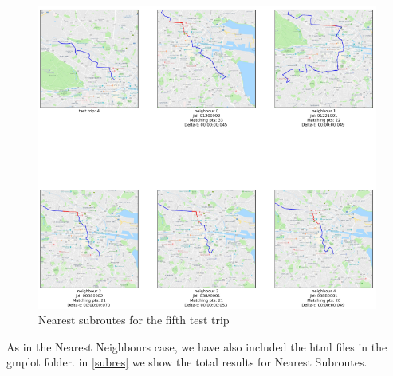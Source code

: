 \documentclass[12pt]{article}
\begin{document}
	\begin{figure} [H]
		\begin{center}
			\includegraphics [scale = 0.80] {subroutes5.png}
			\caption{Nearest subroutes for the fifth test trip}
		\end{center}
	\end{figure}

	As in the Nearest Neighbours case, we have also included the html files in the gmplot folder. in \ref{subres} we show the total results for Nearest Subroutes.
	
\end{document}
